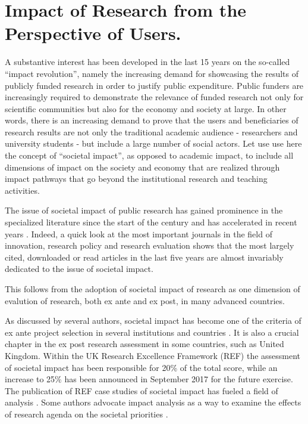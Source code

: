 \documentclass[]{book}
\begin{document}
\chapter{Impact of Research from the Perspective of
Users.}\label{impact-of-research-from-the-perspective-of-users.}

A substantive interest has been developed in the last 15 years on the
so-called ``impact revolution'', namely the increasing demand for
showcasing the results of publicly funded research in order to justify
public expenditure. Public funders are increasingly required to
demonstrate the relevance of funded research not only for scientific
communities but also for the economy and society at large. In other
words, there is an increasing demand to prove that the users and
beneficiaries of research results are not only the traditional academic
audience - researchers and university students - but include a large
number of social actors. Let use use here the concept of ``societal
impact'', as opposed to academic impact, to include all dimensions of
impact on the society and economy that are realized through impact
pathways that go beyond the institutional research and teaching
activities.

The issue of societal impact of public research has gained prominence in
the specialized literature since the start of the century and has
accelerated in recent years
\citep{van2000evaluation, erno2011measuring, bornmann2013societal, bornmann2014evaluate, bornmann2017does}.
Indeed, a quick look at the most important journals in the field of
innovation, research policy and research evaluation shows that the most
largely cited, downloaded or read articles in the last five years are
almost invariably dedicated to the issue of societal impact.

This follows from the adoption of societal impact of research as one
dimension of evalution of research, both ex ante and ex post, in many
advanced countries.

As discussed by several authors, societal impact has become one of the
criteria of ex ante project selection in several institutions and
countries \citep{kanninen2006methods, dance2013impact}. It is also a
crucial chapter in the ex post research assessment in some countries,
such as United Kingdom. Within the UK Research Excellence Framework
(REF) the assessment of societal impact has been responsible for 20\% of
the total score, while an increase to 25\% has been announced in
September 2017 for the future exercise. The publication of REF case
studies of societal impact has fueled a field of analysis
\citep{derrick2014unwrapping, samuel2015societal, khazragui2014measuring}.
Some authors advocate impact analysis as a way to examine the effects of
research agenda on the societal priorities
\citep{cozzens2002evaluating}.
\end{document}
